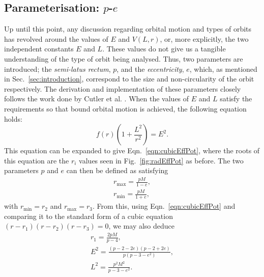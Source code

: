 \subsection{Parameterisation: $p$-$e$}
Up until this point, any discussion regarding orbital motion and types of orbits has revolved around the values of $E$ and $V(L,r)$, or, more explicitly, the two independent constants $E$ and $L$.
These values do not give us a tangible understanding of the type of orbit being analysed.
Thus, two parameters are introduced; the \textit{semi-latus rectum}, $p$, and the \textit{eccentricity}, $e$, which, as mentioned in Sec.~\eqref{sec:introduction}, correspond to the size and non-circularity of the orbit respectively.
The derivation and implementation of these parameters closely follows the work done by Cutler et al. \cite{cutlerEtAl}.
When the values of $E$ and $L$ satisfy the requirements so that bound orbital motion is achieved, the following equation holds:
\begin{equation}
    f(r)\left(1+\frac{L^2}{r^2}\right)=E^2.
\end{equation}
This equation can be expanded to give Eqn.~\eqref{eqn:cubicEffPot}, where the roots of this equation are the $r_i$ values seen in Fig.~\eqref{fig:radEffPot} as before.
The two parameters $p$ and $e$ can then be defined as satisfying
\begin{gather}
		r_{\text{max}}=\frac{pM}{1-e},\label{eqn:rmax}\\
        r_{\text{min}}=\frac{pM}{1+e},\label{eqn:rmin}
\end{gather}
with $r_\text{min}=r_2$ and $r_\text{max}=r_3$.
From this, using Eqn.~\eqref{eqn:cubicEffPot} and comparing it to the standard form of a cubic equation $(r-r_1)(r-r_2)(r-r_3)=0$, we may also deduce
\begin{gather}
r_1=\frac{2pM}{p-4},\\
E^2=\frac{(p-2-2e)(p-2+2e)}{p(p-3-e^2)},\\
L^2=\frac{p^2M^2}{p-3-e^2}.
\end{gather}

